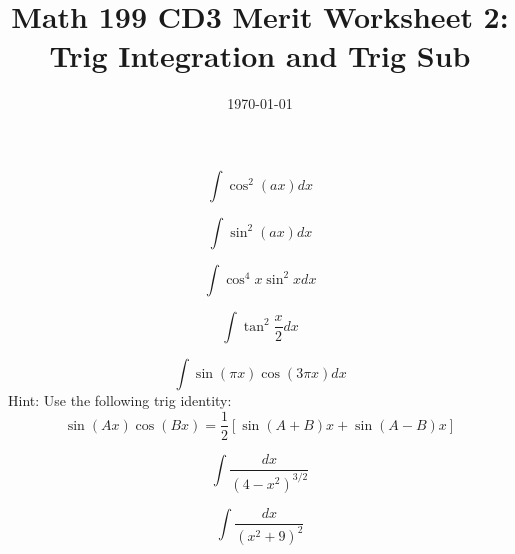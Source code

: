 
\usepackage{fullpage,amsmath,amssymb,amsthm}

\newcommand{\D}{\displaystyle}

\title{Math 199 CD3 Merit Worksheet 2: Trig Integration and Trig Sub }
\date{\today}




\maketitle

\be

	\item $$\int \cos^2(ax) dx$$
	\vskip 4cm

	\item $$\int \sin^2(ax) dx$$

	\vskip 4cm 

	\item $$\int \cos^4x\sin^2 x dx$$
	\vskip 4cm 

	\item $$\int \tan^2\frac{x}{2}dx$$\vskip 5cm 

	\item $$\int \sin(\pi x)\cos(3\pi x) dx$$
	Hint: Use the following trig identity: 
	$$\sin(Ax)\cos(Bx)=\frac{1}{2}[\sin(A+B)x+\sin(A-B)x]$$
	\vskip 5cm
	\item $$\int \frac{dx}{(4-x^2)^{3/2}}$$
	\vskip 5cm 

	\item $$\int \frac{dx}{(x^2+9)^2}$$
\ee

